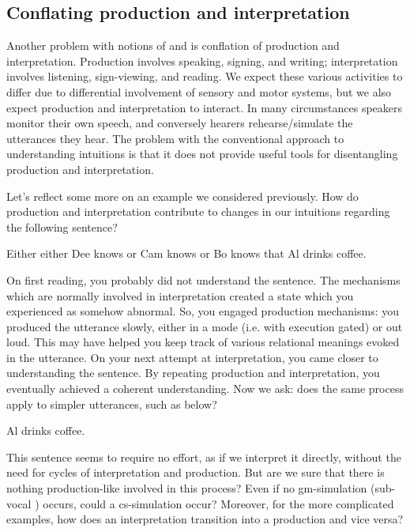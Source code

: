 \subsection{Conflating production and interpretation}

Another problem with notions of  and  is conflation of production and interpretation. Production involves speaking, signing, and writing; interpretation involves listening, sign-viewing, and reading. We expect these various activities to differ due to differential involvement of sensory and motor systems, but we also expect production and interpretation to interact. In many circumstances speakers monitor their own speech, and conversely hearers rehearse/simulate the utterances they hear. The problem with the conventional approach to understanding intuitions is that it does not provide useful tools for disentangling production and interpretation.

  Let's reflect some more on an example we considered previously. How do production and interpretation contribute to changes in our intuitions regarding the following sentence? 

\ea
Either either Dee knows or Cam knows or Bo knows that Al drinks coffee.
\z

  On first reading, you probably did not understand the sentence. The mechanisms which are normally involved in interpretation created a state which you experienced as somehow abnormal. So, you engaged production mechanisms: you produced the utterance slowly, either in a  mode (i.e. with execution gated) or out loud. This may have helped you keep track of various relational meanings evoked in the utterance. On your next attempt at interpretation, you came closer to understanding the sentence. By repeating production and interpretation, you eventually achieved a coherent understanding. Now we ask: does the same process apply to simpler utterances, such as below?

\ea
Al drinks coffee.
\z

  This sentence seems to require no effort, as if we interpret it directly, without the need for cycles of interpretation and production. But are we sure that there is nothing production-like involved in this process? Even if no gm-simulation (sub-vocal ) occurs, could a cs-simulation occur? Moreover, for the more complicated examples, how does an interpretation transition into a production and vice versa?


